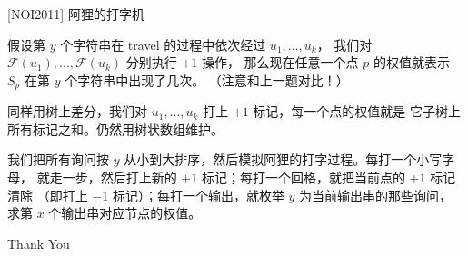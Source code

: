 \documentclass{beamer}
\begin{document}
\begin{frame}[fragile]{[NOI2011] 阿狸的打字机}
    \footnotesize

    假设第 $y$ 个字符串在 travel 的过程中依次经过 $u_1,...,u_k$，
    我们对 $\mathcal{F}(u_1),...,\mathcal{F}(u_k)$ 分别执行 $+1$ 操作，
    那么现在任意一个点 $p$ 的权值就表示 $S_p$ 在第 $y$ 个字符串中出现了几次。
    （注意和上一题对比！）

    \vspace{1em}\pause
    同样用树上差分，我们对 $u_1,...,u_k$ 打上 $+1$ 标记，每一个点的权值就是
    它子树上所有标记之和。仍然用树状数组维护。

    \vspace{1em}\pause
    我们把所有询问按 $y$ 从小到大排序，然后模拟阿狸的打字过程。每打一个小写字母，
    就走一步，然后打上新的 $+1$ 标记；每打一个回格，就把当前点的 $+1$ 标记清除
    （即打上 $-1$ 标记）；每打一个输出，就枚举 $y$ 为当前输出串的那些询问，
    求第 $x$ 个输出串对应节点的权值。
\end{frame}

\begin{frame}
    \begin{center}
        {\Huge\calligra Thank You}
    \end{center}
\end{frame}
\end{document}
